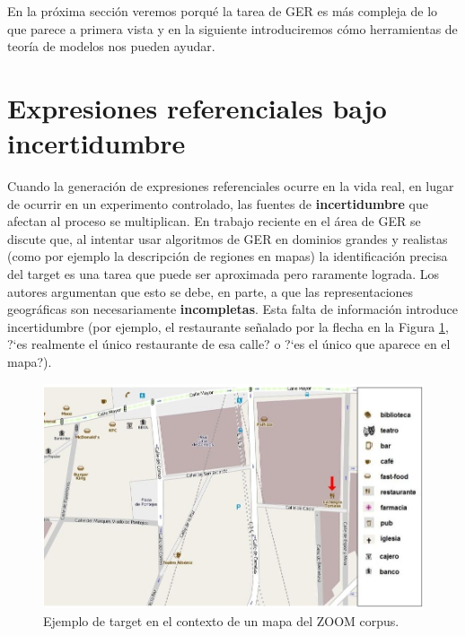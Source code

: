 En la pr\'oxima secci\'on veremos porqu\'e la tarea de GER es m\'as compleja de lo que parece a primera vista y en la siguiente introduciremos c\'omo herramientas de teor\'ia de modelos nos pueden ayudar.

\section{Expresiones referenciales bajo incertidumbre}
\label{sec:gre-incertidumbre}


Cuando la generaci\'on de expresiones referenciales ocurre en la vida real, en lugar de ocurrir en un experimento controlado, las fuentes de \textbf{incertidumbre} que afectan al proceso se multiplican. En trabajo 
reciente en el \'area de GER \cite{turner2008,turner2009} se discute que, al intentar usar algoritmos de GER en dominios grandes 
y realistas (como por ejemplo la descripci\'on de regiones en mapas) la identificaci\'on precisa del target es una tarea que puede ser 
aproximada pero raramente lograda. Los autores argumentan que esto se debe, en parte, a que las representaciones geogr\'aficas 
son necesariamente \textbf{incompletas}. Esta falta de informaci\'on introduce incertidumbre (por ejemplo, el restaurante se\~nalado por la flecha en la Figura \ref{target_mapa}, ?`es realmente el \'unico restaurante de esa calle? o ?`es el \'unico que aparece en el mapa?).

\begin{figure}[h]
\centering
\includegraphics[width=\textwidth]{images/corpus/mapa15.png}
\caption{Ejemplo de target en el contexto de un mapa del ZOOM corpus.}
\label{target_mapa}
\end{figure}

